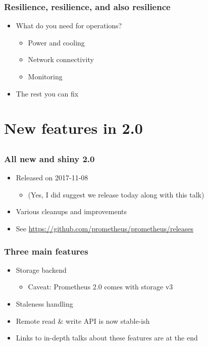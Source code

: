 \documentclass[t]{beamer}
\begin{document}
\begin{frame}
	\frametitle{Resilience, resilience, and also resilience}
	\begin{itemize}
		\item What do you need for operations?
		\begin{itemize}
			\item Power and cooling
			\item Network connectivity
			\item Monitoring
		\end{itemize}
		\item The rest you can fix
	\end{itemize}
\end{frame}


\section{New features in 2.0}
\subsection{}

\begin{frame}
	\frametitle{All new and shiny 2.0}
	\begin{itemize}
		\item Released on 2017-11-08
		\begin{itemize}
			\item (Yes, I did suggest we release today along with this talk)
		\end{itemize}
		\item Various cleanups and improvements
		\item See \url{https://github.com/prometheus/prometheus/releases}
	\end{itemize}
\end{frame}

\begin{frame}
	\frametitle{Three main features}
	\begin{itemize}
		\item Storage backend
		\begin{itemize}
			\item Caveat: Prometheus 2.0 comes with storage v3
		\end{itemize}
		\item Staleness handling
		\item Remote read \& write API is now stable-ish
		\item Links to in-depth talks about these features are at the end
	\end{itemize}
\end{frame}
\end{document}
